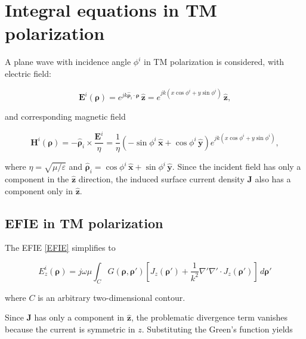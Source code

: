 \documentclass[11pt,a4paper,twoside,pdf]{article}
\numberwithin{equation}{section}
\begin{document}
\section{Integral equations in TM polarization}



A plane wave with incidence angle $\phi^i$ in TM polarization is considered, with electric field:

\begin{equation}
\mathbf{E}^i(\boldsymbol{\rho}) = e^{j k \hat{\boldsymbol{\rho}}_i \cdot \boldsymbol{\rho}} \, \hat{\mathbf{z}}
= e^{j k (x \cos \phi^i + y \sin \phi^i)} \, \hat{\mathbf{z}},
\label{ondaplanaincidente}
\end{equation}

and corresponding magnetic field

\begin{equation}
\mathbf{H}^i(\boldsymbol{\rho})
= - \hat{\boldsymbol{\rho}}_i \times \frac{\mathbf{E}^i}{\eta}
= \frac{1}{\eta}
\left(
- \sin \phi^i \, \hat{\mathbf{x}}
+ \cos \phi^i \, \hat{\mathbf{y}}
\right)
e^{j k (x \cos \phi^i + y \sin \phi^i)},
\label{ondaplanaH}
\end{equation}

where $\eta = \sqrt{\mu/\varepsilon}$ and
$\hat{\boldsymbol{\rho}}_i = \cos \phi^i \, \hat{\mathbf{x}} + \sin \phi^i \, \hat{\mathbf{y}}$.
Since the incident field has only a component in the $\hat{\mathbf{z}}$ direction, the induced surface current density $\mathbf{J}$ also has a component only in $\hat{\mathbf{z}}$.

\subsection{EFIE in TM polarization}

The EFIE \ref{EFIE} simplifies to

\begin{equation}
E_z^i(\bm{\rho})
= j \omega \mu
\int_C
G(\boldsymbol{\rho}, \boldsymbol{\rho}')
\left[
J_z(\boldsymbol{\rho}')
+ \frac{1}{k^2} \nabla' \nabla' \cdot J_z(\boldsymbol{\rho'})
\right]
\, d\boldsymbol{\rho'}
\label{ondaplana}
\end{equation}

where $C$ is an arbitrary two-dimensional contour.

Since $\boldsymbol{J}$ has only a component in $\boldsymbol{\hat{z}}$, the problematic divergence term vanishes because the current is symmetric in $z$. Substituting the Green's function yields
\end{document}
